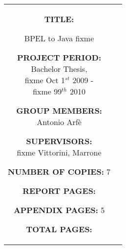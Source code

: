 \documentclass[a4paper,11pt]{article}
\begin{document}
\begin{titlepage}
\begin{nopagebreak}
{\begin{tabular}{cc}
{\begin{description}
\item {\bf TITLE:}

BPEL to Java fixme

\end{description}

\parbox{8cm}{

\begin{description}
         \item {\bf PROJECT PERIOD:}\\
           Bachelor Thesis, \\
           fixme Oct 1$^{st}$ 2009 -\\fixme 99$^{th}$ 2010\\
           \hspace{4cm}
         \item {\bf GROUP MEMBERS:}\\
           Antonio Arfè\\
           \hspace{2cm}
         \item {\bf SUPERVISORS:}\\
           fixme Vittorini, Marrone
\end{description}
}

\begin{description}
        \item {\bf NUMBER OF COPIES:} 7
        \item {\bf REPORT PAGES:} \pageref{report_end}
        \item {\bf APPENDIX PAGES:} 5
        \item {\bf TOTAL PAGES:} \pageref{LastPage}
\end{description}
\vfill } &
\parbox{7cm}{
  \vspace{.15cm}
  \flushright
}
\end{tabular}
}


\end{nopagebreak}
\end{titlepage}



 
\end{document}
